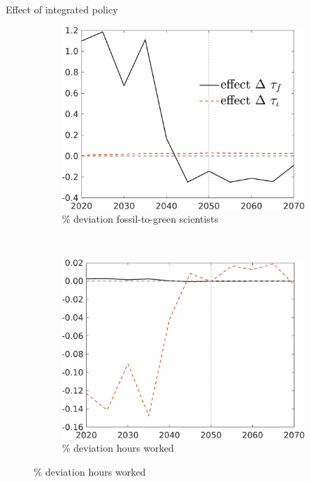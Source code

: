 \documentclass[11pt,aspectratio=169]{beamer}
\begin{document}
\addtocounter{framenumber}{-1}
\begin{frame}{Effect of integrated policy}
	\hypertarget{mec0}{}
	\vspace{-3mm}
	\centering
	\begin{figure}
		\begin{subfigure}{0.45\textwidth}
			\caption{{\% deviation fossil-to-green scientists }}
			\includegraphics[width=1\textwidth]{../codding_model/own_basedOnFried/optimalPol_010922_revision/figures/all_13Sept22/NewCalib_polTaulFixedTaufJointPer_sffsg_Sun2_emnet1_spillover0_knspil3_xgr0_nsk0_sep0_extern0_PV1_etaa0.79_lgd1.png}
		\end{subfigure}
		\begin{minipage}[]{0.05\textwidth}
			\
		\end{minipage}
		\begin{subfigure}{0.45\textwidth}
			\caption{{\% deviation hours worked }}
			\includegraphics[width=1\textwidth]{../codding_model/own_basedOnFried/optimalPol_010922_revision/figures/all_13Sept22/NewCalib_polTaulFixedTaufJointPer_Hagg_Sun2_emnet1_spillover0_knspil3_xgr0_nsk0_sep0_extern0_PV1_etaa0.79_lgd0.png}

\end{subfigure}
\end{figure}
\end{frame}
\end{document}
